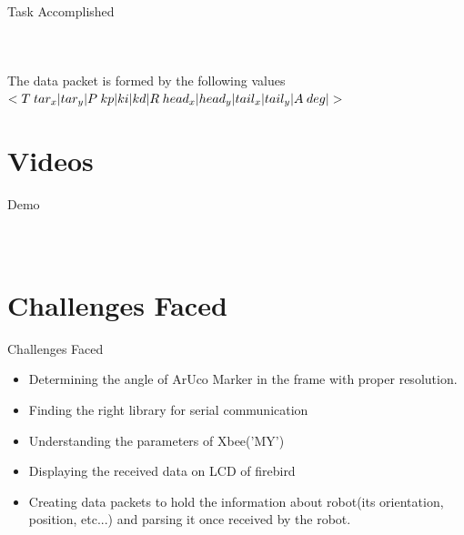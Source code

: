 \documentclass[10pt,a4paper]{beamer}
\begin{document}
\begin{frame}{Task Accomplished}
\begin{columns}
\begin{figure}
\end{figure}	
\end{columns}
\vspace{0.7 em}
The data packet is formed by the following values
\small{$<T\hspace{0.25 em}tar_x|tar_y|P\hspace{0.25 em}kp|ki|kd|R\hspace{0.25 em}head_x|head_y|tail_x|tail_y|A\hspace{0.25 em}deg|>$}
\end{frame}

\section{Videos}
\begin{frame}{Demo}
\begin{columns}
\begin{figure}

\end{figure}
\begin{figure}

\end{figure}

\end{columns}

\end{frame}

\section{Challenges Faced}
\begin{frame}{Challenges Faced}
	\begin{itemize}
		\item Determining the angle of ArUco Marker in the frame with proper resolution.\pause
		\item Finding the right library for serial communication\pause
		\item Understanding the parameters of Xbee('MY')\pause
		\item Displaying the received data on LCD of firebird\pause
		\item Creating data packets to hold the information about robot(its orientation, position, etc...) and parsing it once received by the robot.
	\end{itemize}
\end{frame}
\end{document}
